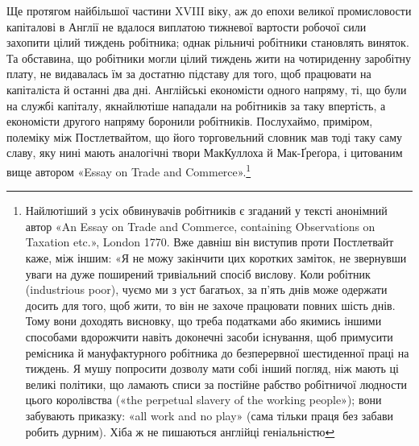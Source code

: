 Ще протягом найбільшої частини XVIII віку, аж до епохи
великої промисловости капіталові в Англії не вдалося виплатою
тижневої вартости робочої сили захопити цілий тиждень робітника;
однак рільничі робітники становлять виняток. Та обставина,
що робітники могли цілий тиждень жити на чотириденну
заробітну плату, не видавалась їм за достатню підставу для того,
щоб працювати на капіталіста й останні два дні. Англійські економісти
одного напряму, ті, що були на службі капіталу, якнайлютіше
нападали на робітників за таку впертість, а економісти
другого напряму боронили робітників. Послухаймо, приміром,
полеміку між Постлетвайтом, що його торговельний словник
мав тоді таку саму славу, яку нині мають аналогічні твори МакКуллоха
й Мак-Ґреґора, і цитованим вище автором «Essay
on Trade and Commerce».\footnote{
Найлютіший з усіх обвинувачів робітників є згаданий у тексті
анонімний автор «An Essay on Trade and Commerce, containing Observations
on Taxation etc.», London 1770. Вже давніш він виступив проти
Постлетвайт каже, між іншим: «Я не можу закінчити цих
коротких заміток, не звернувши уваги на дуже поширений тривіальний
спосіб вислову. Коли робітник (industrious poor), чуємо
ми з уст багатьох, за п’ять днів може одержати досить для того,
щоб жити, то він не захоче працювати повних шість днів. Тому
вони доходять висновку, що треба податками або якимись іншими
способами вдорожчити навіть доконечні засоби існування, щоб
примусити ремісника й мануфактурного робітника до безперервної
шестиденної праці на тиждень. Я мушу попросити дозволу мати
собі інший погляд, ніж мають ці великі політики, що ламають
списи за постійне рабство робітничої людности цього королівства
(«the perpetual slavery of the working people»); вони забувають
приказку: «all work and no play» (сама тільки праця без
забави робить дурним). Хіба ж не пишаються англійці геніальністю
}
